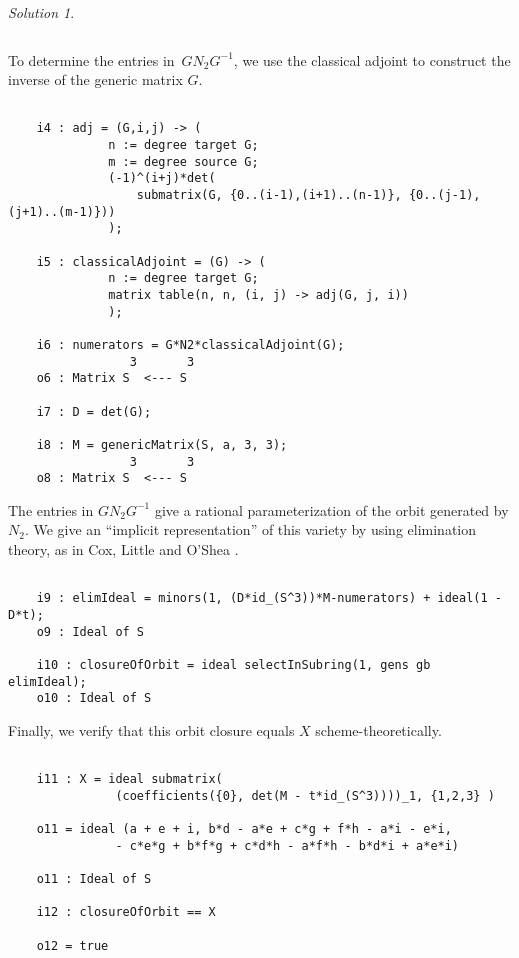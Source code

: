 \documentclass[12pt,noamsfonts]{amsart}
\theoremstyle{definition}
\theoremstyle{remark}
\newtheorem*{solution}{Solution}
\begin{document}
\begin{solution}
{\begin{verbatim}
\end{verbatim}}
\noindent To determine the entries in $\, G N_{2} G^{-1}$, we use the
classical adjoint to construct the inverse of the generic matrix $G$.
{\scriptsize
\begin{verbatim}

    i4 : adj = (G,i,j) -> (
              n := degree target G;
              m := degree source G;
              (-1)^(i+j)*det(
                  submatrix(G, {0..(i-1),(i+1)..(n-1)}, {0..(j-1),(j+1)..(m-1)}))
              );
    
    i5 : classicalAdjoint = (G) -> (
              n := degree target G;
              matrix table(n, n, (i, j) -> adj(G, j, i))
              );
    
    i6 : numerators = G*N2*classicalAdjoint(G);
                 3       3
    o6 : Matrix S  <--- S
    
    i7 : D = det(G);
    
    i8 : M = genericMatrix(S, a, 3, 3);
                 3       3
    o8 : Matrix S  <--- S

\end{verbatim}}
\noindent The entries in $G N_{2} G^{-1}$ give a rational
parameterization of the orbit generated by $N_{2}$.  We give an
``implicit representation'' of this variety by using elimination
theory, as in  Cox, Little and O'Shea \cite[\S 3.3]{CLO}.
{\scriptsize
\begin{verbatim}

    i9 : elimIdeal = minors(1, (D*id_(S^3))*M-numerators) + ideal(1 - D*t);
    o9 : Ideal of S
    
    i10 : closureOfOrbit = ideal selectInSubring(1, gens gb elimIdeal);
    o10 : Ideal of S

\end{verbatim}}
\noindent Finally, we verify that this orbit closure equals $X$
scheme-theoretically.
{\scriptsize
\begin{verbatim}

    i11 : X = ideal submatrix( 
               (coefficients({0}, det(M - t*id_(S^3))))_1, {1,2,3} )
    
    o11 = ideal (a + e + i, b*d - a*e + c*g + f*h - a*i - e*i, 
               - c*e*g + b*f*g + c*d*h - a*f*h - b*d*i + a*e*i)
    
    o11 : Ideal of S
    
    i12 : closureOfOrbit == X
    
    o12 = true

\end{verbatim}}
\end{solution}
\end{document}
